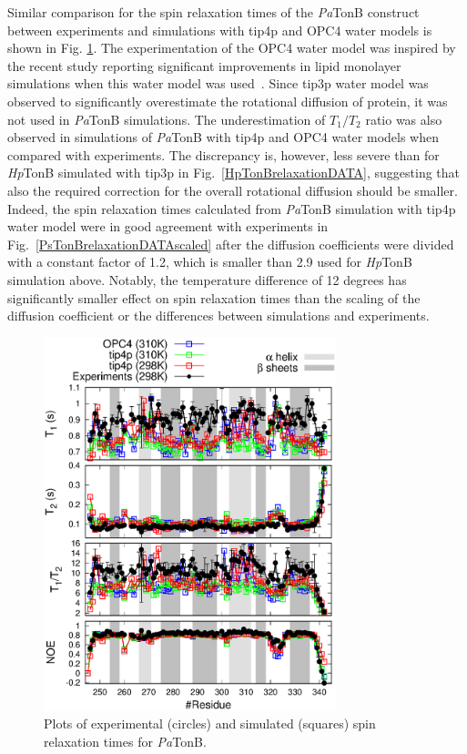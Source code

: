 \documentclass[pre,aps,floatfix,authordate1-4,twocolumn]{revtex4-1}
\begin{document}
Similar comparison for the spin relaxation times of the {\it Pa}TonB construct
between experiments and simulations with tip4p and OPC4 water models
is shown in Fig. \ref{PsTonBrelaxationDATA}.
The experimentation of the OPC4 water model was inspired by the
recent study reporting significant improvements in lipid monolayer
simulations when this water model was used~\cite{javanainen17}. 
Since tip3p water model was observed to significantly overestimate the
rotational diffusion of protein, it was not used in {\it Pa}TonB
simulations. The underestimation of $T_1/T_2$ ratio was 
also observed in simulations of {\it Pa}TonB with
tip4p and OPC4 water models when compared with experiments.
The discrepancy is, however, less severe than for {\it Hp}TonB simulated
with tip3p in Fig.~\ref{HpTonBrelaxationDATA}, suggesting that also
the required correction for the overall rotational diffusion should
be smaller. Indeed,
the spin relaxation times calculated
from {\it Pa}TonB simulation with tip4p water model
were in good agreement with experiments in Fig.~\ref{PsTonBrelaxationDATAscaled}
after the diffusion coefficients were divided with a constant factor of 1.2,
which is smaller than 2.9 used for {\it Hp}TonB simulation above.
Notably, the temperature difference of 12 degrees has significantly 
smaller effect on spin relaxation times than the scaling of the diffusion 
coefficient or the differences between simulations and experiments.
\begin{figure}[!h]
  \includegraphics[width=8.5cm]{../Figs/PsTonBrelaxationDATA.eps}%
  \caption{Plots of experimental (circles) and simulated (squares) spin relaxation times
    for {\it Pa}TonB. \label{PsTonBrelaxationDATA}}%
\end{figure}
\end{document}
